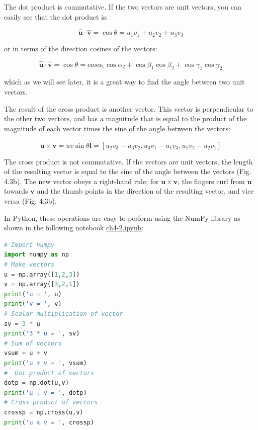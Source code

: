 \documentclass[a4paper , 12pt]{book}
\begin{document}
The dot product is commutative. If the two vectors are unit vectors, you can easily see that the dot product is:

\begin{equation}
    \mathbf{\hat u} \cdot\mathbf{\hat v}=\cos\theta=u_1v_1+u_2v_2+u_3v_3
\end{equation}

or in terms of the direction cosines of the vectors:

\begin{equation}
    \mathbf{\hat u} \cdot\mathbf{\hat v}=\cos\theta=cos\alpha_1\cos\alpha_2+\cos\beta_1\cos\beta_2+\cos\gamma_1\cos\gamma_2
\end{equation}

which as we will see later, it is a great way to find the angle between two unit vectors.

The result of the cross product is another vector. This vector is perpendicular to the other two vectors, and has a magnitude that is equal to the product of the magnitude of each vector times the sine of the angle between the vectors:

\begin{equation}
    \mathbf u\times\mathbf v=uv\sin\theta\mathbf{\hat l}=[u_2v_3-u_3v_2,u_3v_1-u_1v_3,u_1v_2-u_2v_1]
\end{equation}

The cross product is not commutative. If the vectors are unit vectors, the length of the resulting vector is equal to the sine of the angle between the vectors (Fig. 4.3b). The new vector obeys a right-hand rule; for $\mathbf u\times\mathbf v$, the fingers curl from $\mathbf u$ towards $\mathbf v$ and the thumb points in the direction of the resulting vector, and vice versa (Fig. 4.3b).

In Python, these operations are easy to perform using the NumPy library as shown in the following notebook \href{http://github.com}{ch4-2.ipynb}:

\begin{center}
\begin{lstlisting}[language=Python, frame=single]
# Import numpy
import numpy as np
# Make vectors
u = np.array([1,2,3])
v = np.array([3,2,1])
print('u = ', u)
print('v = ', v)
# Scalar multiplication of vector
sv = 3 * u
print('3 * u = ', sv)
# Sum of vectors
vsum = u + v
print('u + v = ', vsum)
#  Dot product of vectors
dotp = np.dot(u,v)
print('u . v = ', dotp)
# Cross product of vectors
crossp = np.cross(u,v) 
print('u x v = ', crossp)
\end{lstlisting}
\end{center}
\end{document}
